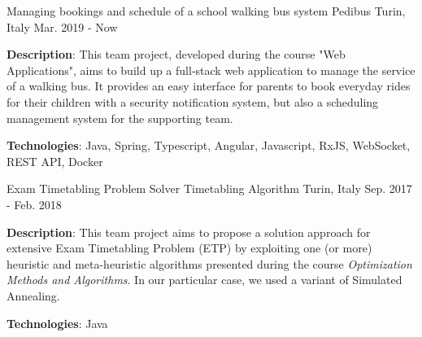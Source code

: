{\begin{cventries}
  \cventry
  {Managing bookings and schedule of a school walking bus system} %
  {Pedibus} %
  {Turin, Italy} %
  {Mar. 2019 - Now} %
  {
   \begin{cvitems} %
     \item {\textbf{Description}: This team project, developed during the course "Web Applications", aims to build up a full-stack web application to manage the service of a walking bus. It provides an easy interface for parents to book everyday rides for their children with a security notification system, but also a scheduling management system for the supporting team.}
      \item {\textbf{Technologies}: Java, Spring, Typescript, Angular, Javascript, RxJS, WebSocket, REST API, Docker}
   \end{cvitems}
  }{}

  \cventry
    {Exam Timetabling Problem Solver} %
    {Timetabling Algorithm} %
    {Turin, Italy} %
    {Sep. 2017 - Feb. 2018} %
    {
      \begin{cvitems} %
        \item {\textbf{Description}: This team project aims to propose a solution approach for extensive Exam Timetabling Problem (ETP) by exploiting one (or more) heuristic and meta-heuristic algorithms presented during the course \textit{Optimization Methods and Algorithms}. In our particular case, we used a variant of Simulated Annealing.}
        \item {\textbf{Technologies}: Java}
      \end{cvitems}
    }{\href{https://github.com/pieromacaluso/ETPsolver_OMAMZ_group09}{\faGithub}}
\end{cventries}
}
